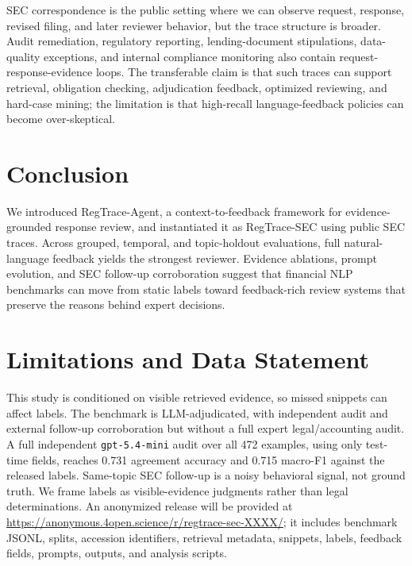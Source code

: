\documentclass[11pt]{article}
\newcommand{\dataset}{RegTrace-SEC}
\newcommand{\framework}{RegTrace-Agent}
\begin{document}
SEC correspondence is the public setting where we can observe request, response, revised filing, and later reviewer behavior, but the trace structure is broader. Audit remediation, regulatory reporting, lending-document stipulations, data-quality exceptions, and internal compliance monitoring also contain request-response-evidence loops. The transferable claim is that such traces can support retrieval, obligation checking, adjudication feedback, optimized reviewing, and hard-case mining; the limitation is that high-recall language-feedback policies can become over-skeptical.

\section{Conclusion}

We introduced \framework{}, a context-to-feedback framework for evidence-grounded response review, and instantiated it as \dataset{} using public SEC traces. Across grouped, temporal, and topic-holdout evaluations, full natural-language feedback yields the strongest reviewer. Evidence ablations, prompt evolution, and SEC follow-up corroboration suggest that financial NLP benchmarks can move from static labels toward feedback-rich review systems that preserve the reasons behind expert decisions.

\section*{Limitations and Data Statement}

This study is conditioned on visible retrieved evidence, so missed snippets can affect labels. The benchmark is LLM-adjudicated, with independent audit and external follow-up corroboration but without a full expert legal/accounting audit. A full independent \texttt{gpt-5.4-mini} audit over all 472 examples, using only test-time fields, reaches 0.731 agreement accuracy and 0.715 macro-F1 against the released labels. Same-topic SEC follow-up is a noisy behavioral signal, not ground truth. We frame labels as visible-evidence judgments rather than legal determinations. An anonymized release will be provided at \url{https://anonymous.4open.science/r/regtrace-sec-XXXX/}; it includes benchmark JSONL, splits, accession identifiers, retrieval metadata, snippets, labels, feedback fields, prompts, outputs, and analysis scripts.

\clearpage


\appendix
\end{document}
